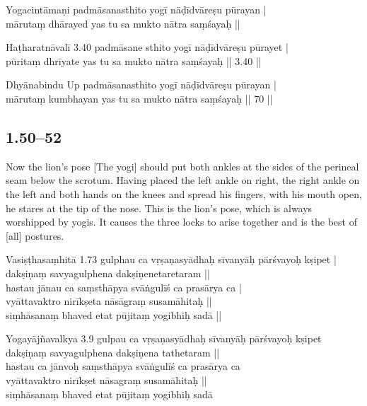 \begin{ekdosis}
\begin{testimonia}[hp01_049]
Yogacintāmaṇi
\startverse
padmāsanasthito yogī nāḍīdvāreṣu pūrayan |\\
mārutaṃ dhārayed yas tu sa mukto nātra saṃśayaḥ ||
\endverse

Haṭharatnāvalī 3.40
\startverse
padmāsane sthito yogī nāḍīdvāreṣu pūrayet |\\
pūritaṃ dhrīyate yas tu sa mukto nātra saṃśayaḥ || 3.40 ||
\endverse

Dhyānabindu Up
\startverse
padmāsanasthito yogī nāḍīdvāreṣu pūrayan |\\
mārutaṃ kumbhayan yas tu sa mukto nātra saṃśayaḥ || 70 ||
\endverse
\end{testimonia}


\subsection*{1.50--52}
\begin{translation}[hp01_050]
Now the lion’s pose
[The yogi] should put both ankles at the sides of the perineal seam below the scrotum. Having placed the left ankle on right, the right ankle on the left and both hands on the knees and spread his fingers, with his mouth open, he stares at the tip of the nose. This is the lion’s pose, which is always worshipped by yogis. It causes the three locks to arise together and is the best of [all] postures.
\end{translation}

\begin{sources}[hp01_050]
Vasiṣṭhasaṃhitā 1.73
\startverse
gulphau ca vṛṣaṇasyādhaḥ sīvanyāḥ pārśvayoḥ kṣipet |\\
dakṣiṇaṃ savyagulphena dakṣiṇenetaretaram ||\\
hastau jānau ca saṃsthāpya svāṅgulīś ca prasārya ca |\\
vyāttavaktro nirīkṣeta nāsāgraṃ susamāhitaḥ ||\\
siṃhāsanaṃ bhaved etat pūjitaṃ yogibhiḥ sadā ||
\endverse

Yogayājñavalkya 3.9
\startverse
gulpau ca vṛṣaṇasyādhaḥ sīvanyāḥ pārśvayoḥ kṣipet\\
dakṣiṇaṃ savyagulphena dakṣiṇena tathetaram ||\\
hastau ca jānvoḥ saṃsthāpya svāṅgulīś ca prasārya ca\\
vyāttavaktro nirīkṣet nāsagraṃ susamāhitaḥ ||\\
siṃhāsanaṃ bhaved etat pūjitaṃ yogibhiḥ sadā
\endverse


\end{sources}
\end{ekdosis}
